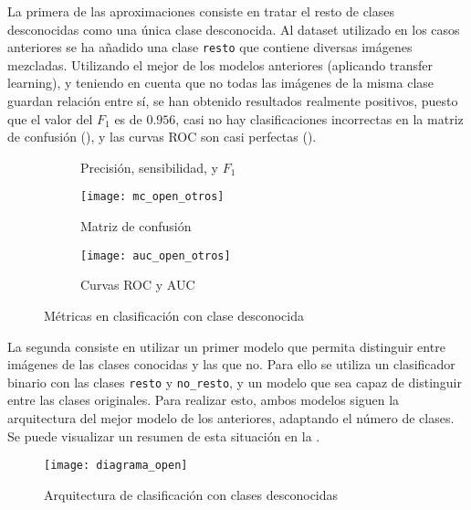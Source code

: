 				La primera de las aproximaciones consiste en tratar el resto de clases desconocidas como una única clase desconocida. Al dataset utilizado en los casos anteriores se ha añadido una clase \texttt{resto} que contiene diversas imágenes mezcladas. Utilizando el mejor de los modelos anteriores (aplicando transfer learning), y teniendo en cuenta que no todas las imágenes de la misma clase guardan relación entre sí, se han obtenido resultados realmente positivos, puesto que el valor del $F_1$ es de $0.956$, casi no hay clasificaciones incorrectas en la matriz de confusión (), y las curvas ROC son casi perfectas (). \\
				
				\begin{figure}[!h]
					\centering
					\begin{subfigure}{.5\textwidth}
						\centering
						
						\caption{Precisión, sensibilidad, y $F_1$}
						\label{fig:m_open_otros}
					\end{subfigure}
					\begin{subfigure}{.5\textwidth}
						\centering
						\texttt{[image: mc\_open\_otros]}
						\caption{Matriz de confusión}
						\label{fig:mc_open_otros}
					\end{subfigure}\hfill
					\begin{subfigure}{.5\textwidth}
						\centering
						\texttt{[image: auc\_open\_otros]}
						\caption{Curvas ROC y AUC}
						\label{fig:roc_open_otros}
					\end{subfigure}
					\caption{Métricas en clasificación con clase desconocida}
					\label{fig:clase_otros}
				\end{figure}
				
				La segunda consiste en utilizar un primer modelo que permita distinguir entre imágenes de las clases conocidas y las que no. Para ello se utiliza un clasificador binario con las clases \texttt{resto} y \texttt{no\_resto}, y un modelo que sea capaz de distinguir entre las clases originales. Para realizar esto, ambos modelos siguen la arquitectura del mejor modelo de los anteriores, adaptando el número de clases. Se puede visualizar un resumen de esta situación en la . \\
				
				\begin{figure}[!h]
					\texttt{[image: diagrama\_open]} 
					\caption{Arquitectura de clasificación con clases desconocidas}
					\label{fig:openset}
				\end{figure}
				
